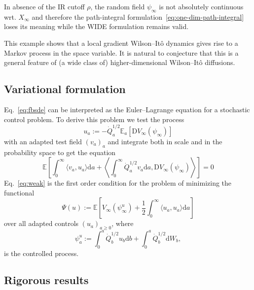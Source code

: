 \documentclass[reprint,aps]{revtex4-2}
\newcommand{\assign}{:=}
\newcommand{\mathD}{\mathrm{D}}
\newcommand{\mathd}{\mathrm{d}}
\newcommand{\bbE}{\mathbb{E}}
\begin{document}
In absence of the IR cutoff $\rho$, the random field $\psi_{\infty}$ is not
absolutely continuous wrt. $X_{\infty}$ and therefore the path-integral
formulation~\eqref{eq:one-dim-path-integral} loses its meaning while the WIDE
formulation remains valid.

This example shows that a local gradient Wilson--It{\^o} dynamics gives rise
to a Markov process in the space variable. It is natural to conjecture that
this is a general feature of (a wide class of) higher-dimensional
Wilson--It{\^o} diffusions.

\subsection{Variational formulation}

Eq.~\eqref{eq:fbsde} can be interpreted as the Euler--Lagrange equation for a
stochastic control problem. To derive this problem we test the process
\[ u_a \assign - \dot{Q}_a^{1 / 2} \bbE_a [\mathD V_{\infty} (\psi_{\infty})]
\]
with an adapted test field $(v_a)_a$ and integrate both in scale and in the
probability space to get the equation
\begin{equation}
  \mathbb{E} \left[ \int_0^{\infty} \langle v_a, u_a \rangle \mathd a +
  \left\langle \int_0^{\infty} \dot{Q}_a^{1 / 2} v_a \mathd a, \mathD
  V_{\infty} (\psi_{\infty}) \right\rangle \right] = 0 \label{eq:weak}
\end{equation}
Eq.~\eqref{eq:weak} is the first order condition for the problem of minimizing
the functional
\begin{equation}
  \Psi (u) \assign \mathbb{E} \left[ V_{\infty} (\psi_{\infty}^u) +
  \frac{1}{2} \int_0^{\infty} \langle u_a, u_a \rangle \mathd a \right]
  \label{eq:var}
\end{equation}
over all adapted controls $(u_a)_{a \geqslant 0}$, where
\[ \psi_a^u \assign \int_0^a \dot{Q}_b^{1 / 2} u_b \mathd b + \int_0^a
   \dot{Q}_b^{1 / 2} \mathd W_b, \]
is the controlled process.

\subsection{Rigorous results}
\end{document}
